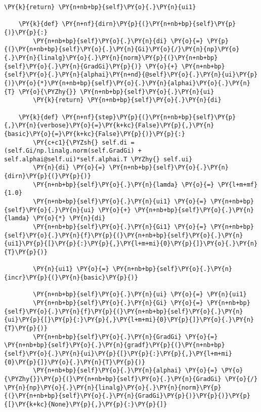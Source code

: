 \begin{tcolorbox}[breakable, size=fbox, boxrule=1pt, pad at break*=1mm,colback=cellbackground, colframe=cellborder]
\begin{Verbatim}[commandchars=\\\{\}]
        \PY{k}{return} \PY{n+nb+bp}{self}\PY{o}{.}\PY{n}{ui1}
    
    \PY{k}{def} \PY{n+nf}{dirn}\PY{p}{(}\PY{n+nb+bp}{self}\PY{p}{)}\PY{p}{:}
        \PY{n+nb+bp}{self}\PY{o}{.}\PY{n}{di} \PY{o}{=} \PY{p}{(}\PY{n+nb+bp}{self}\PY{o}{.}\PY{n}{Gi}\PY{o}{/}\PY{n}{np}\PY{o}{.}\PY{n}{linalg}\PY{o}{.}\PY{n}{norm}\PY{p}{(}\PY{n+nb+bp}{self}\PY{o}{.}\PY{n}{GradGi}\PY{p}{)} \PY{o}{+} \PY{n+nb+bp}{self}\PY{o}{.}\PY{n}{alphai}\PY{n+nd}{@self}\PY{o}{.}\PY{n}{ui}\PY{p}{)}\PY{o}{*}\PY{n+nb+bp}{self}\PY{o}{.}\PY{n}{alphai}\PY{o}{.}\PY{n}{T} \PY{o}{\PYZhy{}} \PY{n+nb+bp}{self}\PY{o}{.}\PY{n}{ui}
        \PY{k}{return} \PY{n+nb+bp}{self}\PY{o}{.}\PY{n}{di}

    \PY{k}{def} \PY{n+nf}{step}\PY{p}{(}\PY{n+nb+bp}{self}\PY{p}{,}\PY{n}{verbose}\PY{o}{=}\PY{k+kc}{False}\PY{p}{,}\PY{n}{basic}\PY{o}{=}\PY{k+kc}{False}\PY{p}{)}\PY{p}{:}
        \PY{c+c1}{\PYZsh{} self.di = (self.Gi/np.linalg.norm(self.GradGi) + self.alphai@self.ui)*self.alphai.T \PYZhy{} self.ui}
        \PY{n}{di} \PY{o}{=} \PY{n+nb+bp}{self}\PY{o}{.}\PY{n}{dirn}\PY{p}{(}\PY{p}{)}
        \PY{n+nb+bp}{self}\PY{o}{.}\PY{n}{lamda} \PY{o}{=} \PY{l+m+mf}{1.0}
        \PY{n+nb+bp}{self}\PY{o}{.}\PY{n}{ui1} \PY{o}{=} \PY{n+nb+bp}{self}\PY{o}{.}\PY{n}{ui} \PY{o}{+} \PY{n+nb+bp}{self}\PY{o}{.}\PY{n}{lamda} \PY{o}{*} \PY{n}{di}
        \PY{n+nb+bp}{self}\PY{o}{.}\PY{n}{Gi1} \PY{o}{=} \PY{n+nb+bp}{self}\PY{o}{.}\PY{n}{f}\PY{p}{(}\PY{n+nb+bp}{self}\PY{o}{.}\PY{n}{ui1}\PY{p}{[}\PY{p}{:}\PY{p}{,}\PY{l+m+mi}{0}\PY{p}{]}\PY{o}{.}\PY{n}{T}\PY{p}{)}

        \PY{n}{ui1} \PY{o}{=} \PY{n+nb+bp}{self}\PY{o}{.}\PY{n}{incr}\PY{p}{(}\PY{n}{basic}\PY{p}{)}

        \PY{n+nb+bp}{self}\PY{o}{.}\PY{n}{ui} \PY{o}{=} \PY{n}{ui1}  
        \PY{n+nb+bp}{self}\PY{o}{.}\PY{n}{Gi} \PY{o}{=} \PY{n+nb+bp}{self}\PY{o}{.}\PY{n}{f}\PY{p}{(}\PY{n+nb+bp}{self}\PY{o}{.}\PY{n}{ui}\PY{p}{[}\PY{p}{:}\PY{p}{,}\PY{l+m+mi}{0}\PY{p}{]}\PY{o}{.}\PY{n}{T}\PY{p}{)}
        \PY{n+nb+bp}{self}\PY{o}{.}\PY{n}{GradGi} \PY{o}{=} \PY{n+nb+bp}{self}\PY{o}{.}\PY{n}{gradf}\PY{p}{(}\PY{n+nb+bp}{self}\PY{o}{.}\PY{n}{ui}\PY{p}{[}\PY{p}{:}\PY{p}{,}\PY{l+m+mi}{0}\PY{p}{]}\PY{o}{.}\PY{n}{T}\PY{p}{)}
        \PY{n+nb+bp}{self}\PY{o}{.}\PY{n}{alphai} \PY{o}{=} \PY{o}{\PYZhy{}}\PY{p}{(}\PY{n+nb+bp}{self}\PY{o}{.}\PY{n}{GradGi} \PY{o}{/} \PY{n}{np}\PY{o}{.}\PY{n}{linalg}\PY{o}{.}\PY{n}{norm}\PY{p}{(}\PY{n+nb+bp}{self}\PY{o}{.}\PY{n}{GradGi}\PY{p}{)}\PY{p}{)}\PY{p}{[}\PY{k+kc}{None}\PY{p}{,}\PY{p}{:}\PY{p}{]}


\end{Verbatim}
\end{tcolorbox}
